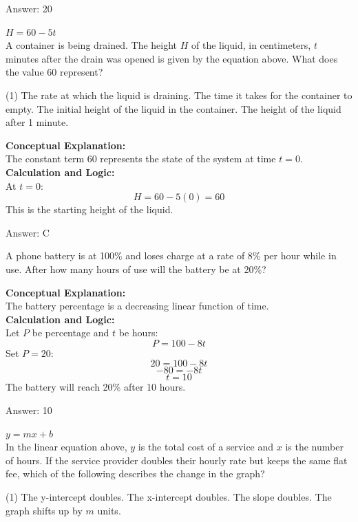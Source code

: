\documentclass[11pt,paper=a4,answers]{exam}
\begin{document}
\begin{questions}
\begin{solution}
\vspace{15pt}
Answer: \colorbox{yellow!100}{20}
\end{solution}

\question
$H = 60 - 5t$ \\
A container is being drained. The height $H$ of the liquid, in centimeters, $t$ minutes after the drain was opened is given by the equation above. What does the value 60 represent?
\begin{tasks}(1)
    \task The rate at which the liquid is draining.
    \task The time it takes for the container to empty.
    \task The initial height of the liquid in the container.
    \task The height of the liquid after 1 minute.
\end{tasks}

\begin{solution}
\textbf{Conceptual Explanation:} \\
The constant term 60 represents the state of the system at time $t=0$.
\\[10pt]
\textbf{Calculation and Logic:} \\
At $t = 0$:
\[H = 60 - 5(0) = 60\]
This is the starting height of the liquid.

\vspace{15pt}
Answer: \colorbox{yellow!100}{C}
\end{solution}

\question
A phone battery is at 100\% and loses charge at a rate of 8\% per hour while in use. After how many hours of use will the battery be at 20\%?

\begin{solution}
\textbf{Conceptual Explanation:} \\
The battery percentage is a decreasing linear function of time.
\\[10pt]
\textbf{Calculation and Logic:} \\
Let $P$ be percentage and $t$ be hours:
\[P = 100 - 8t\]
Set $P = 20$:
\[20 = 100 - 8t\]
\[-80 = -8t\]
\[t = 10\]
The battery will reach 20\% after 10 hours.

\vspace{15pt}
Answer: \colorbox{yellow!100}{10}
\end{solution}

\question
$y = mx + b$ \\
In the linear equation above, $y$ is the total cost of a service and $x$ is the number of hours. If the service provider doubles their hourly rate but keeps the same flat fee, which of the following describes the change in the graph?
\begin{tasks}(1)
    \task The y-intercept doubles.
    \task The x-intercept doubles.
    \task The slope doubles.
    \task The graph shifts up by $m$ units.
\end{tasks}


\end{questions}
\end{document}
